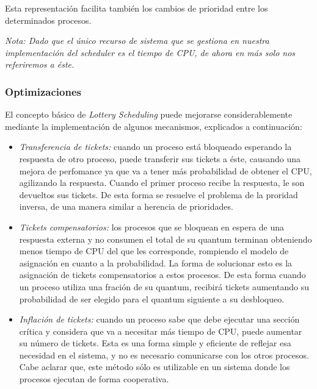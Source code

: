 Esta representaci\'on facilita tambi\'en los cambios de prioridad entre los determinados procesos.

\textit{Nota: Dado que el \'unico recurso de sistema que se gestiona en nuestra implementaci\'on del scheduler es el tiempo de CPU, de ahora en m\'as solo nos referiremos a \'este.}

\subsubsection{Optimizaciones}

El concepto b\'asico de \textit{Lottery Scheduling} puede mejorarse considerablemente mediante la implementaci\'on de algunos mecanismos, explicados a continuaci\'on:

\begin{itemize}

\item \textit{Transferencia de tickets:} cuando un proceso est\'a bloqueado esperando la respuesta de otro proceso, puede transferir sus tickets a \'este, causando una mejora de perfomance ya que va a tener m\'as probabilidad de obtener el CPU, agilizando la respuesta. Cuando el primer proceso recibe la respuesta, le son devueltos sus tickets. De esta forma se resuelve el problema de la proridad inversa, de una manera similar a herencia de prioridades.

\item \textit{Tickets compensatorios:} los procesos que se bloquean en espera de una respuesta externa y no consumen el total de su quantum terminan obteniendo menos tiempo de CPU del que les corresponde, rompiendo el modelo de asignaci\'on en cuanto a la probabilidad. La forma de solucionar esto es la asignaci\'on de tickets compensatorios a estos procesos. De esta forma cuando un proceso utiliza una fraci\'on de su quantum, recibir\'a tickets aumentando su probabilidad de ser elegido para el quantum siguiente a su desbloqueo.

\item \textit{Inflaci\'on de tickets:} cuando un proceso sabe que debe ejecutar una secci\'on cr\'itica y considera que va a necesitar m\'as tiempo de CPU, puede aumentar su n\'umero de tickets. Esta es una forma simple y eficiente de reflejar esa necesidad en el sistema, y no es necesario comunicarse con los otros procesos. Cabe aclarar que, este m\'etodo s\'olo es utilizable en un sistema donde los procesos ejecutan de forma cooperativa. 

\end{itemize}

